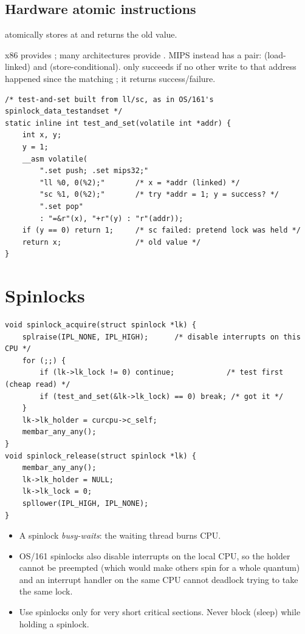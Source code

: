 \subsection{Hardware atomic instructions}
\begin{definition}
 atomically stores  at  and returns the old value.
\end{definition}
x86 provides ; many architectures provide . MIPS instead has a
pair:  (load-linked) and  (store-conditional).  only succeeds if no
other write to that address happened since the matching ; it returns success/failure.

\begin{lstlisting}[style=c]
/* test-and-set built from ll/sc, as in OS/161's spinlock_data_testandset */
static inline int test_and_set(volatile int *addr) {
    int x, y;
    y = 1;
    __asm volatile(
        ".set push; .set mips32;"
        "ll %0, 0(%2);"       /* x = *addr (linked) */
        "sc %1, 0(%2);"       /* try *addr = 1; y = success? */
        ".set pop"
        : "=&r"(x), "+r"(y) : "r"(addr));
    if (y == 0) return 1;     /* sc failed: pretend lock was held */
    return x;                 /* old value */
}
\end{lstlisting}

\section{Spinlocks}

\begin{lstlisting}[style=c]
void spinlock_acquire(struct spinlock *lk) {
    splraise(IPL_NONE, IPL_HIGH);      /* disable interrupts on this CPU */
    for (;;) {
        if (lk->lk_lock != 0) continue;            /* test first (cheap read) */
        if (test_and_set(&lk->lk_lock) == 0) break; /* got it */
    }
    lk->lk_holder = curcpu->c_self;
    membar_any_any();
}
void spinlock_release(struct spinlock *lk) {
    membar_any_any();
    lk->lk_holder = NULL;
    lk->lk_lock = 0;
    spllower(IPL_HIGH, IPL_NONE);
}
\end{lstlisting}

\begin{itemize}
  \item A spinlock \emph{busy-waits}: the waiting thread burns CPU.
  \item OS/161 spinlocks also disable interrupts on the local CPU, so the holder cannot be
    preempted (which would make others spin for a whole quantum) and an interrupt handler on the
    same CPU cannot deadlock trying to take the same lock.
  \item Use spinlocks only for very short critical sections. Never block (sleep) while holding
    a spinlock.
\end{itemize}


